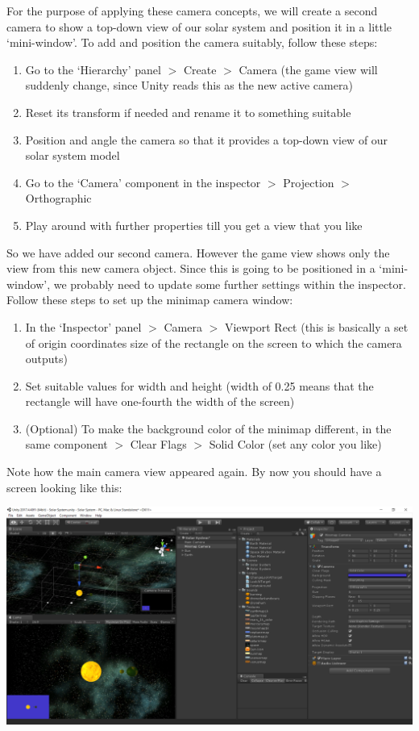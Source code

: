 \documentclass{article}[a4paper,12pt]
\theoremstyle{definition}
\begin{document}
For the purpose of applying these camera concepts, we will create a second camera to show a top-down view of our solar system and position it in a little `mini-window'. To add and position the camera suitably, follow these steps:
\begin{enumerate}
	\item Go to the `Hierarchy' panel $>$ Create $>$ Camera (the game view will suddenly change, since Unity reads this as the new active camera)
	\item Reset its transform if needed and rename it to something suitable
	\item Position and angle the camera so that it provides a top-down view of our solar system model
	\item Go to the `Camera' component in the inspector $>$ Projection $>$ Orthographic
	\item Play around with further properties till you get a view that you like
\end{enumerate}
So we have added our second camera. However the game view shows only the view from this new camera object. Since this is going to be positioned in a `mini-window', we probably need to update some further settings within the inspector. Follow these steps to set up the minimap camera window:
\begin{enumerate}
	\item In the `Inspector' panel $>$ Camera $>$ Viewport Rect (this is basically a set of origin coordinates size of the rectangle on the screen to which the camera outputs)
	\item Set suitable values for width and height (width of 0.25 means that the rectangle will have one-fourth the width of the screen)
	\item (Optional) To make the background color of the minimap different, in the same component $>$ Clear Flags $>$ Solid Color (set any color you like)
\end{enumerate}
Note how the main camera view appeared again. By now you should have a screen looking like this:
\begin{center}\includegraphics[width=\textwidth]{minimap_camera.png}\end{center}
\vspace{6pt}
\end{document}
